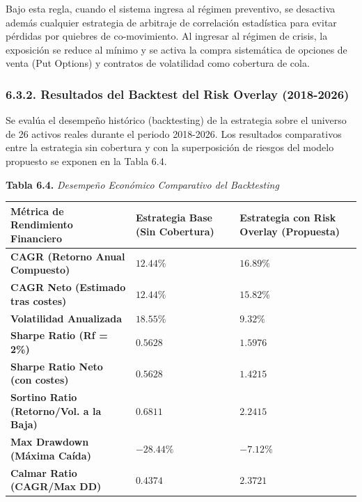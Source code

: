 \documentclass[
  12pt,
]{article}
\newcounter{none} %
\begin{document}
Bajo esta regla, cuando el sistema ingresa al régimen preventivo, se
desactiva además cualquier estrategia de arbitraje de correlación
estadística para evitar pérdidas por quiebres de co-movimiento. Al
ingresar al régimen de crisis, la exposición se reduce al mínimo y se
activa la compra sistemática de opciones de venta (Put Options) y
contratos de volatilidad como cobertura de cola.

\subsubsection{6.3.2. Resultados del Backtest del Risk Overlay (2018-2026)}\label{b.2.-resultados-del-backtest-del-risk-overlay-2018-2026}

Se evalúa el desempeño histórico (backtesting) de la estrategia sobre el
universo de 26 activos reales durante el periodo 2018-2026. Los
resultados comparativos entre la estrategia sin cobertura y con la
superposición de riesgos del modelo propuesto se exponen en la Tabla
6.4.

\textbf{Tabla 6.4.} \emph{Desempeño Económico Comparativo del
Backtesting}

{\def\LTcaptype{none} %
\begin{longtable}[]{@{}
  >{\raggedright\arraybackslash}p{}
  >{\centering\arraybackslash}p{}
  >{\centering\arraybackslash}p{}@{}}
\toprule\noalign{}
\begin{minipage}[b]{\linewidth}\raggedright
Métrica de Rendimiento Financiero
\end{minipage} & \begin{minipage}[b]{\linewidth}\centering
Estrategia Base (Sin Cobertura)
\end{minipage} & \begin{minipage}[b]{\linewidth}\centering
Estrategia con Risk Overlay (Propuesta)
\end{minipage} \\
\midrule\noalign{}
\endhead
\bottomrule\noalign{}
\endlastfoot
\textbf{CAGR (Retorno Anual Compuesto)} & \(12.44\%\) & \(16.89\%\) \\
\textbf{CAGR Neto (Estimado tras costes)} & \(12.44\%\) & \(15.82\%\) \\
\textbf{Volatilidad Anualizada} & \(18.55\%\) & \(9.32\%\) \\
\textbf{Sharpe Ratio (Rf = 2\%)} & \(0.5628\) & \(1.5976\) \\
\textbf{Sharpe Ratio Neto (con costes)} & \(0.5628\) & \(1.4215\) \\
\textbf{Sortino Ratio (Retorno/Vol. a la Baja)} & \(0.6811\) &
\(2.2415\) \\
\textbf{Max Drawdown (Máxima Caída)} & \(-28.44\%\) & \(-7.12\%\) \\
\textbf{Calmar Ratio (CAGR/Max DD)} & \(0.4374\) & \(2.3721\) \\
\end{longtable}
}
\end{document}
